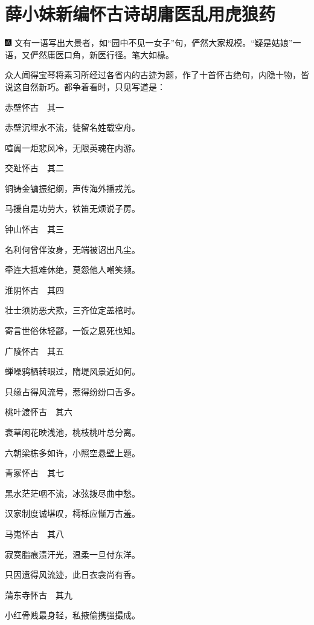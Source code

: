 

\chapter{薛小妹新编怀古诗\hspace{.5em}胡庸医乱用虎狼药}

{\includegraphics[width=3mm]{../Images/00005}  \kaishu 文有一语写出大景者，如“园中不见一女子”句，俨然大家规模。“疑是姑娘”一语，又俨然庸医口角，新医行径。笔大如椽。}

众人闻得宝琴将素习所经过各省内的古迹为题，作了十首怀古绝句，内隐十物，皆说这自然新巧。都争着看时，只见写道是：

赤壁怀古　其一

赤壁沉埋水不流，徒留名姓载空舟。

喧阗一炬悲风冷，无限英魂在内游。

交趾怀古　其二

铜铸金镛振纪纲，声传海外播戎羌。

马援自是功劳大，铁笛无烦说子房。

钟山怀古　其三

名利何曾伴汝身，无端被诏出凡尘。

牵连大抵难休绝，莫怨他人嘲笑频。

淮阴怀古　其四

壮士须防恶犬欺，三齐位定盖棺时。

寄言世俗休轻鄙，一饭之恩死也知。

广陵怀古　其五

蝉噪鸦栖转眼过，隋堤风景近如何。

只缘占得风流号，惹得纷纷口舌多。

桃叶渡怀古　其六

衰草闲花映浅池，桃枝桃叶总分离。

六朝梁栋多如许，小照空悬壁上题。

青冢怀古　其七

黑水茫茫咽不流，冰弦拨尽曲中愁。

汉家制度诚堪叹，樗栎应惭万古羞。

马嵬怀古　其八

寂寞脂痕渍汗光，温柔一旦付东洋。

只因遗得风流迹，此日衣衾尚有香。

蒲东寺怀古　其九

小红骨贱最身轻，私掖偷携强撮成。

